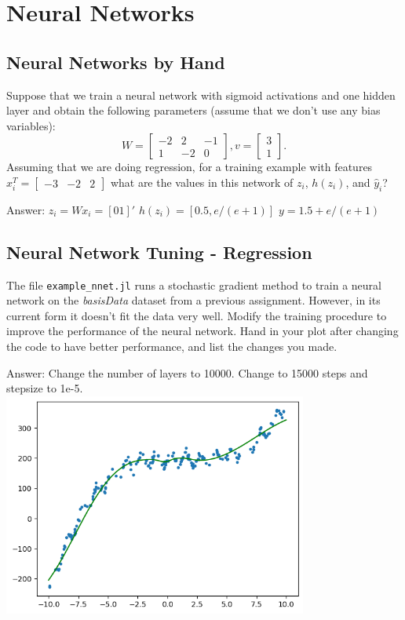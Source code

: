 \documentclass{article}
\def\ans#1{\par\gre{Answer: #1}}
\def\blu#1{{\color{blu}#1}}
\def\gre#1{{\color{gre}#1}}
\newcommand{\mat}[1]{\begin{bmatrix}#1\end{bmatrix}}
\begin{document}
\section{Neural Networks}


\subsection{Neural Networks by Hand}

Suppose that we train a neural network with sigmoid activations and one hidden layer and obtain the following parameters (assume that we don't use any bias variables):
\[
W = \mat{-2 & 2 & -1\\1 & -2 & 0}, v = \mat{3 \\1}.
\]
Assuming that we are doing regression, \blu{for a training example with features $x_i^T = \mat{-3 &-2 & 2}$ what are the values in this network of $z_i$, $h(z_i)$, and $\hat{y}_i$?}
\ans{
    $z_i = Wx_i = [0 1]'$
    $h(z_i) = [0.5, e/(e+1)]$
    $y = 1.5 + e/(e+1)$
}
\subsection{Neural Network Tuning - Regression}

The file \texttt{example\_nnet.jl} runs a stochastic gradient method to train a neural network on the \emph{basisData} dataset from a previous assignment. However, in its current form it doesn't fit the data very well. Modify the training procedure to improve the performance of the neural network. \blu{Hand in your plot after changing the code to have better performance, and list the changes you made}.
\ans{
    Change the number of layers to 10000. Change to 15000 steps and stepsize to 1e-5.
    \\\includegraphics[width=10cm]{Q32.png}
    }
\end{document}
